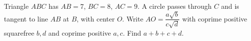 Triangle $ABC$ has $AB=7$, $BC=8$, $AC=9$. A circle passes through $C$ and is tangent to line $AB$ at $B$, with center $O$. Write $AO=\dfrac{a\sqrt b}{c\sqrt d}$ with coprime positive squarefree $b,d$ and coprime positive $a,c$. Find $a+b+c+d$.
